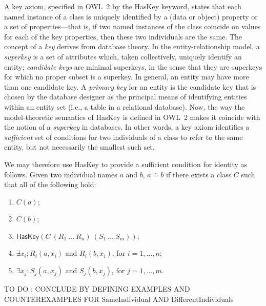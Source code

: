 \documentclass[a4paper]{article}
\newcounter{ex}
\begin{document}
A key axiom, specified in OWL~2 by the \textsf{HasKey} keyword, states that
each named instance of a class is uniquely identified by a (data or object) property
or a set of properties---that is, if two named instances of the class coincide
on values for each of the key properties, then these two individuals are the same.
The concept of a \emph{key} derives from database theory. In the entity-relationship
model, a \emph{superkey} is a set of attributes which, taken collectively, uniquely
identify an entity; \emph{candidate keys} are minimal superkeys, in the sense that
they are superkeys for which no proper subset is a superkey. In general, an entity
may have more than one candidate key. A \emph{primary key} for an entity is
the candidate key that is chosen by the database designer as the principal means
of identifying entities within an entity set (i.e., a table in a relational database).
Now, the way the model-theoretic semantics of \textsf{HasKey} is defined in OWL~2
makes it coincide with the notion of a \emph{superkey} in databases. In other words,
a key axiom identifies a \emph{sufficient} set of conditions for two individuals
of a class to refer to the same entity, but not necessarily the smallest such set.

We may therefore use \textsf{HasKey} to provide a sufficient condition for identity
as follows.
Given two individual names $a$ and $b$, $a \doteq b$ if there exists a class $C$
such that all of the following hold:
\begin{enumerate}
\item $C(a)$;
\item $C(b)$;
\item $\mathsf{HasKey}(C\ (R_1\ \ldots\ R_n)\ (S_1\ \ldots\ S_m))$;
\item $\exists x_i : R_i(a, x_i)$ and $R_i(b, x_i)$, for $i = 1, \ldots, n$;
\item $\exists x_j : S_j(a, x_j)$ and $S_j(b, x_j)$, for $j = 1, \ldots, m$.
\end{enumerate}

TO DO : CONCLUDE BY DEFINING EXAMPLES AND COUNTEREXAMPLES
        FOR \textsf{SameIndividual} AND \textsf{DifferentIndividuals}
\end{document}
